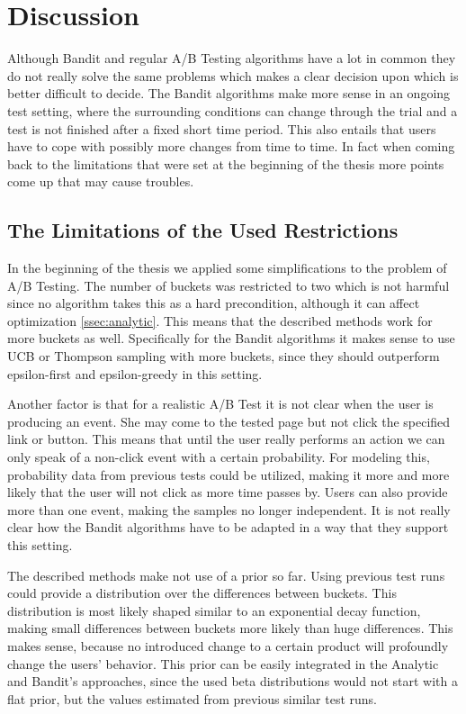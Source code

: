 \documentclass[main.tex]{subfiles}
\begin{document}
\chapter{Discussion}
Although Bandit and regular A/B Testing algorithms have a lot in common they do not really solve the same problems which makes a clear decision upon which is better difficult to decide. The Bandit algorithms make more sense in an ongoing test setting, where the surrounding conditions can change through the trial and a test is not finished after a fixed short time period. This also entails that users have to cope with possibly more changes from time to time. In fact when coming back to the limitations that were set at the beginning of the thesis more points come up that may cause troubles.

\section{The Limitations of the Used Restrictions}
In the beginning of the thesis we applied some simplifications to the problem of A/B Testing. The number of buckets was restricted to two which is not harmful since no algorithm takes this as a hard precondition, although it can affect optimization \ref{ssec:analytic}. This means that the described methods work for more buckets as well. Specifically for the Bandit algorithms it makes sense to use UCB or Thompson sampling with more buckets, since they should outperform epsilon-first and epsilon-greedy in this setting.

Another factor is that for a realistic A/B Test it is not clear when the user is producing an event. She may come to the tested page but not click the specified link or button. This means that until the user really performs an action we can only speak of a non-click event with a certain probability. For modeling this, probability data from previous tests could be utilized, making it more and more likely that the user will not click as more time passes by. Users can also provide more than one event, making the samples no longer independent. It is not really clear how the Bandit algorithms have to be adapted in a way that they support this setting.

The described methods make not use of a prior so far. Using previous test runs could provide a distribution over the differences between buckets. This distribution is most likely shaped similar to an exponential decay function, making small differences between buckets more likely than huge differences. This makes sense, because no introduced change to a certain product will profoundly change the users' behavior. This prior can be easily integrated in the Analytic and Bandit's approaches, since the used beta distributions would not start with a flat prior, but the values estimated from previous similar test runs.
\end{document}
